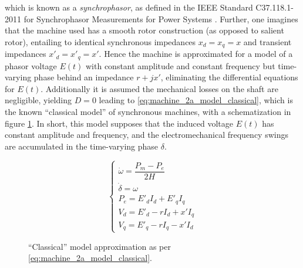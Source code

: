 	\noindent which is known as a \textit{synchrophasor}, as defined in the IEEE Standard C37.118.1-2011 for Synchrophasor Measurements for Power Systems . Further, one imagines that the machine used has a smooth rotor construction (as opposed to salient rotor), entailing to identical synchronous impedances $x_d = x_q = x$ and transient impedances $x'_d = x'_q = x'$. Hence the machine is approximated for a model of a phasor voltage $E(t)$ with constant amplitude and constant frequency but time-varying phase behind an impedance $r + jx'$, eliminating the differential equations for $E(t)$. Additionally it is assumed the mechanical losses on the shaft are negligible, yielding $D = 0$ leading to \eqref{eq:machine_2a_model_classical}, which is the known ``classical model'' of synchronous machines, with a schematization in figure \ref{fig:machine_model_classic}. In short, this model supposes that the induced voltage $E(t)$ has constant amplitude and frequency, and the electromechanical frequency swings are accumulated in the time-varying phase $\delta$.

\begin{equation}
	\left\{\begin{array}{l}
		\dot{\omega} = \dfrac{P_m - P_e}{2H} \\[5mm]
		\dot{\delta} = \omega \\[5mm]
		P_e = E'_dI_d + E'_qI_q \\[5mm]
		V_d = E'_d - rI_d + x'I_q \\[5mm]
		V_q = E'_q - rI_q - x'I_d 
	\end{array}\right. \label{eq:machine_2a_model_classical}
\end{equation} %

\begin{figure}[h]
\centering
	\caption{``Classical'' model approximation as per \eqref{eq:machine_2a_model_classical}.}
	\label{fig:machine_model_classic}
\end{figure} %

